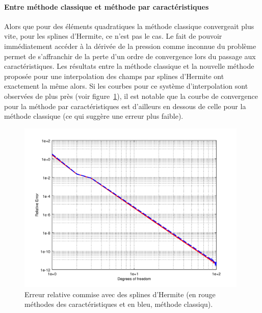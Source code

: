 \paragraph{Entre méthode classique et méthode par caractéristiques}
Alors que pour des éléments quadratiques la méthode classique convergeait plus vite, pour les splines d'Hermite, ce
n'est pas le cas.
Le fait de pouvoir immédiatement accéder à la dérivée de la pression comme inconnue du problème permet de s'affranchir
de la perte d'un ordre de convergence lors du passage aux caractéristiques. Les résultats entre la méthode classique et
la nouvelle méthode proposée pour une interpolation des champs par splines d'Hermite ont exactement la même alors. Si
les courbes pour ce système d'interpolation sont observées de plus près (voir figure~\ref{fig:herm_seul}), il est
notable que la courbe de convergence pour la méthode par caractéristiques est d'ailleurs en dessous de celle pour la
méthode classique (ce qui suggère une erreur plus faible).

\begin{figure}[!ht]
	\centering
	\includegraphics[width=11cm]{part4/figs/herm_seul.png}
	\caption{\label{fig:herm_seul}Erreur relative commise avec des splines d'Hermite (en rouge méthodes des
    caractéristiques et en bleu, méthode classiqu).}
\end{figure}
